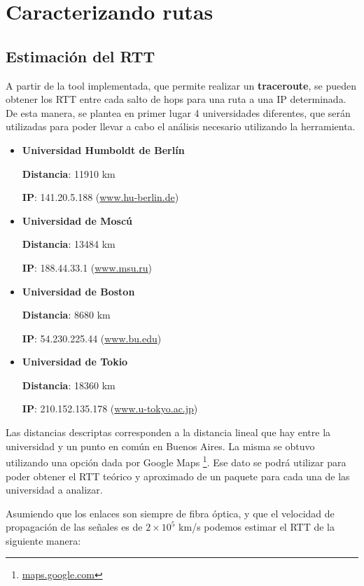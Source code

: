 \section{Caracterizando rutas}

\subsection{Estimación del RTT}
A partir de la tool implementada, que permite realizar un \textbf{traceroute}, se pueden obtener los RTT entre cada salto de hops para una ruta a una IP determinada. De esta manera, se plantea en primer lugar 4 universidades diferentes, que serán utilizadas para poder llevar a cabo el análisis necesario utilizando la herramienta.

\begin{itemize}
 \item {\bf Universidad Humboldt de Berlín}

	{\bf Distancia}: 11910 km

	{\bf IP}: 141.20.5.188 (\url{www.hu-berlin.de}{})

 \item {\bf Universidad de Moscú}

	{\bf Distancia}: 13484 km

	{\bf IP}: 188.44.33.1 (\url{www.msu.ru}{})

 \item {\bf Universidad de Boston}

	{\bf Distancia}: 8680 km

	{\bf IP}: 54.230.225.44 (\url{www.bu.edu}{})

 \item {\bf Universidad de Tokio}

	{\bf Distancia}: 18360 km

	{\bf IP}: 210.152.135.178 (\url{www.u-tokyo.ac.jp}{})

\end{itemize}

Las distancias descriptas corresponden a la distancia lineal que hay entre la universidad y un punto en común en Buenos Aires. La misma se obtuvo utilizando una opción dada por Google Maps \footnote{\url{maps.google.com}{}}. Ese dato se podrá utilizar para poder obtener el RTT teórico y aproximado de un paquete para cada una de las universidad a analizar.

Asumiendo que los enlaces son siempre de fibra óptica, y que el velocidad de propagación de las señales es de $2 \times 10^{5}$ km/s podemos estimar el RTT de la siguiente manera:

